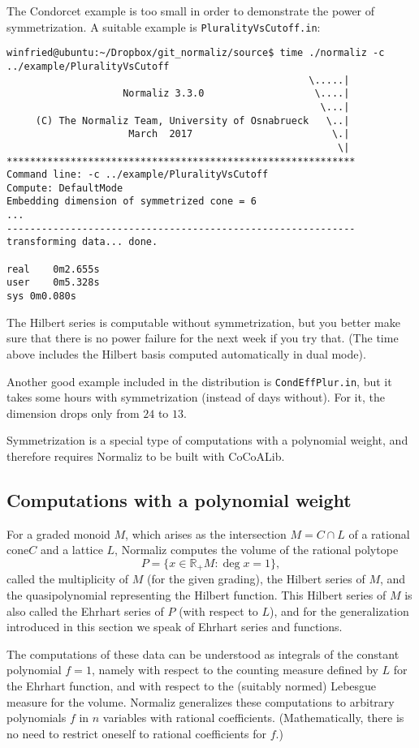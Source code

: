 \documentclass[12pt,a4paper]{scrartcl}
\theoremstyle{definition}
\def\RR{{\mathbb R}}
\begin{document}
{The Condorcet example is too small in order to demonstrate the power of symmetrization. A suitable example is \verb|PluralityVsCutoff.in|:
\begin{Verbatim}
winfried@ubuntu:~/Dropbox/git_normaliz/source$ time ./normaliz -c ../example/PluralityVsCutoff
                                                    \.....|
                    Normaliz 3.3.0                   \....|
                                                      \...|
     (C) The Normaliz Team, University of Osnabrueck   \..|
                     March  2017                        \.|
                                                         \|
************************************************************
Command line: -c ../example/PluralityVsCutoff 
Compute: DefaultMode 
Embedding dimension of symmetrized cone = 6
...
------------------------------------------------------------
transforming data... done.

real	0m2.655s
user	0m5.328s
sys	0m0.080s
\end{Verbatim}
The Hilbert series is computable without symmetrization, but you better make sure that there is no power failure for the next week if you try that. (The time above includes the Hilbert basis computed automatically in dual mode).

Another good example included in the distribution is \verb|CondEffPlur.in|, but it takes some hours with symmetrization (instead of days without). For it, the dimension drops only from $24$ to $13$.

Symmetrization is a special type of computations with a polynomial weight, and therefore requires Normaliz to be built with CoCoALib. 

\subsection{Computations with a polynomial weight}\label{Poly_comp}

For a graded monoid $M$, which arises as the intersection $M=C\cap L$ of a rational cone$C$  and a lattice $L$,  Normaliz computes the volume of
the rational polytope
$$
P=\{x\in \RR_+ M: \deg x=1\},
$$
called the multiplicity of $M$ (for the given grading), the  Hilbert series of $M$, and the quasipolynomial representing the Hilbert function. This Hilbert series of $M$ is also called the Ehrhart series of $P$ (with respect to $L$), and for the generalization introduced in this section we speak of Ehrhart series and functions.

The computations of these data can be understood as integrals of the
constant polynomial $f=1$, namely with respect to the counting
measure defined by $L$ for the Ehrhart function, and with
respect to the (suitably normed) Lebesgue measure for the
volume. Normaliz generalizes these computations to
arbitrary polynomials $f$ in $n$ variables with rational
coefficients. (Mathematically, there is no need to restrict
oneself to rational coefficients for $f$.)

}
\end{document}
